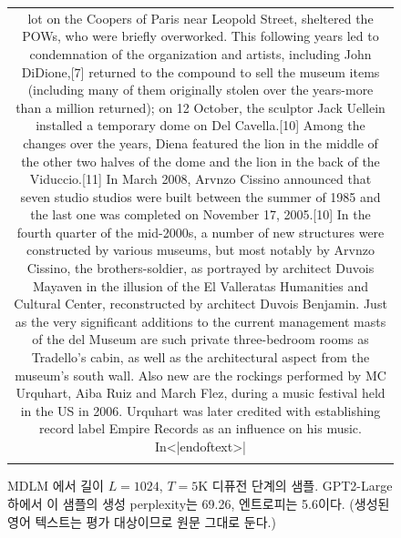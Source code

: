 \begin{figure}[H]
\begin{tabular}{c}
{\begin{minipage}{0.9\textwidth}
lot on the Coopers of Paris near Leopold Street, sheltered the POWs, who were briefly overworked. This following years led to condemnation of the organization and artists, including John DiDione,[7] returned to the compound to sell the museum items (including many of them originally stolen over the years-more than a million returned); on 12 October, the sculptor Jack Uellein installed a temporary dome on Del Cavella.[10] Among the changes over the years, Diena featured the lion in the middle of the other two halves of the dome and the lion in the back of the Viduccio.[11] In March 2008, Arvnzo Cissino announced that seven studio studios were built between the summer of 1985 and the last one was completed on November 17, 2005.[10] In the fourth quarter of the mid-2000s, a number of new structures were constructed by various museums, but most notably by Arvnzo Cissino, the brothers-soldier, as portrayed by architect Duvois Mayaven in the illusion of the El Valleratas Humanities and Cultural Center, reconstructed by architect Duvois Benjamin. Just as the very significant additions to the current management masts of the del Museum are such private three-bedroom rooms as Tradello's cabin, as well as the architectural aspect from the museum's south wall. Also new are the rockings performed by MC Urquhart, Aiba Ruiz and March Flez, during a music festival held in the US in 2006. Urquhart was later credited with establishing record label Empire Records as an influence on his music. In<|endoftext>|
    
    \end{minipage}} \\
    \\
       
    \end{tabular}
    \caption{MDLM \citep{sahoo2024simple}에서 길이 $L=1024$, $T=5$K 디퓨전 단계의 샘플. GPT2-Large 하에서 이 샘플의 생성 perplexity는 69.26, 엔트로피는 5.6이다. (생성된 영어 텍스트는 평가 대상이므로 원문 그대로 둔다.)}
    \label{mdlm-samples}
\end{figure}


            
            
